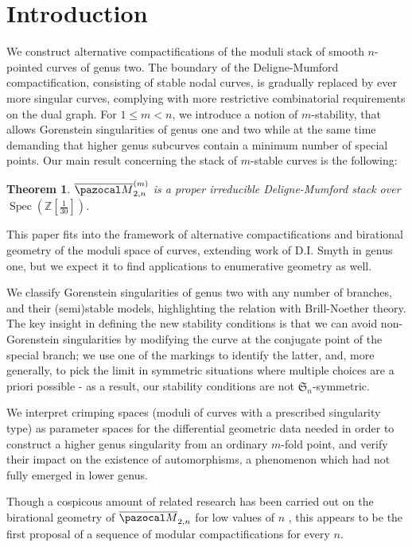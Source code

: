 \documentclass{compositio}
\newcommand{\oM}{\overline{\pazocal M}}
\theoremstyle{plain}
\newtheorem*{theorem*}{Theorem}
\theoremstyle{definition}
\theoremstyle{remark}
\begin{document}
\section{Introduction}
We construct alternative compactifications of the moduli stack of smooth $n$-pointed curves of genus two. The boundary of the Deligne-Mumford compactification, consisting of stable nodal curves, is gradually replaced by ever more singular curves, complying with more restrictive combinatorial requirements on the dual graph. For $1\leq m <n$, we introduce a notion of $m$-stability, that allows Gorenstein singularities of genus one and two while at the same time demanding that higher genus subcurves contain a minimum number of special points. Our main result concerning the stack of $m$-stable curves is the following:
\begin{theorem*}
 $\oM^{(m)}_{2,n}$ is a \emph{proper} irreducible Deligne-Mumford stack over $\operatorname{Spec}(\mathbb Z[\frac{1}{30}])$.
\end{theorem*}
This paper fits into the framework of alternative compactifications and birational geometry of the moduli space of curves, extending work of D.I. Smyth in genus one, but we expect it to find applications to enumerative geometry as well.

We classify Gorenstein singularities of genus two with any number of branches, and their (semi)stable models, highlighting the relation with Brill-Noether theory. The key insight in defining the new stability conditions is that we can avoid non-Gorenstein singularities by modifying the curve at the conjugate point of the special branch; we use one of the markings to identify the latter, and, more generally, to pick the limit in symmetric situations where multiple choices are a priori possible - as a result, our stability conditions are not $\mathfrak S_n$-symmetric.

We interpret crimping spaces (moduli of curves with a prescribed singularity type) as parameter spaces for the differential geometric data needed in order to construct a higher genus singularity from an ordinary $m$-fold point, and verify their impact on the existence of automorphisms, a phenomenon which had not fully emerged in lower genus.

Though a cospicous amount of related research has been carried out on the birational geometry of $\oM_{2,n}$ for low values of $n$ \cite{Hassettg2,HL-tricanonical,Rulla,HL-birational_contraction, FedorchukGrimes,PolishchukJohnson}, this appears to be the first proposal of a sequence of modular compactifications for every $n$.
\end{document}

